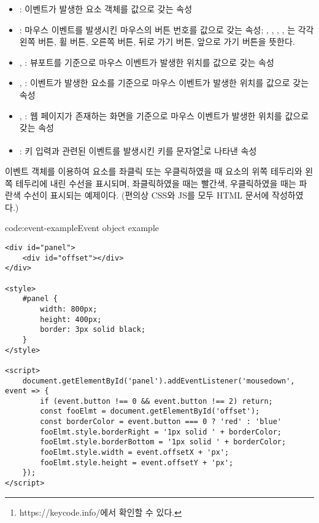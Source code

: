 \begin{itemize}
    \item {}: 이벤트가 발생한 요소 객체를 값으로 갖는 속성
    \item {}: 마우스 이벤트를 발생시킨 마우스의 버튼 번호를 값으로 갖는 속성; , , , , 는 각각 왼쪽 버튼, 휠 버튼, 오른쪽 버튼, 뒤로 가기 버튼, 앞으로 가기 버튼을 뜻한다.
    \item {}, : 뷰포트를 기준으로 마우스 이벤트가 발생한 위치를 값으로 갖는 속성
    \item {}, : 이벤트가 발생한 요소를 기준으로 마우스 이벤트가 발생한 위치를 값으로 갖는 속성
    \item {}, : 웹 페이지가 존재하는 화면을 기준으로 마우스 이벤트가 발생한 위치를 값으로 갖는 속성
    \item {}: 키 입력과 관련된 이벤트를 발생시킨 키를 문자열\footnote{https://keycode.info/에서 확인할 수 있다.}로 나타낸 속성
\end{itemize}

\은 이벤트 객체를 이용하여  요소를 좌클릭 또는 우클릭하였을 때  요소의 위쪽 테두리와 왼쪽 테두리에 내린 수선을 표시되며, 좌클릭하였을 때는 빨간색, 우클릭하였을 때는 파란색 수선이 표시되는 예제이다. (편의상 CSS와 JS를 모두 HTML 문서에 작성하였다.)

\begin{code}{code:event-example}{Event object example}
\begin{verbatim}
<div id="panel">
    <div id="offset"></div>
</div>

<style>
    #panel {
        width: 800px;
        height: 400px;
        border: 3px solid black;
    }
</style>

<script>
    document.getElementById('panel').addEventListener('mousedown', event => {
        if (event.button !== 0 && event.button !== 2) return;
        const fooElmt = document.getElementById('offset');
        const borderColor = event.button === 0 ? 'red' : 'blue'
        fooElmt.style.borderRight = '1px solid ' + borderColor;
        fooElmt.style.borderBottom = '1px solid ' + borderColor;
        fooElmt.style.width = event.offsetX + 'px';
        fooElmt.style.height = event.offsetY + 'px';
    });
</script>
\end{verbatim}
\end{code}
